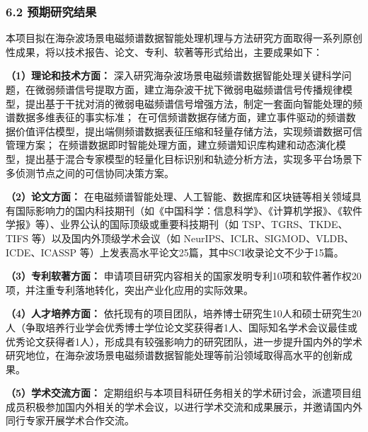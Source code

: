 \subsubsection{6.2 预期研究结果}

{\kaishu
	本项目拟在海杂波场景电磁频谱数据智能处理机理与方法研究方面取得一系列原创性成果，将以技术报告、论文、专利、软著等形式给出，主要成果如下：
	
	\textbf{（1）理论和技术方面：}
	深入研究海杂波场景电磁频谱数据智能处理关键科学问题，在微弱频谱信号提取方面，建立海杂波干扰下微弱电磁频谱信号传播规律模型，提出基于干扰对消的微弱电磁频谱信号增强方法，制定一套面向智能处理的频谱数据多维表征的事实标准；
	在可信频谱数据存储方面，建立事件驱动的频谱数据价值评估模型，提出端侧频谱数据表征压缩和轻量存储方法，实现频谱数据可信管理方案；
	在频谱数据即时智能处理方面，建立频谱知识库构建和动态演化模型，提出基于混合专家模型的轻量化目标识别和轨迹分析方法，实现多平台场景下多侦测节点之间的可信协同决策方案。
	
	\textbf{（2）论文方面：}
	在电磁频谱智能处理、人工智能、数据库和区块链等相关领域具有国际影响力的国内科技期刊（如《中国科学：信息科学》、《计算机学报》、《软件学报》等）、业界公认的国际顶级或重要科技期刊（如 TSP、TGRS、TKDE、TIFS 等）以及国内外顶级学术会议（如 NeurIPS、ICLR、SIGMOD、VLDB、ICDE、ICASSP 等）上发表高水平论文25篇，其中SCI收录论文不少于15篇。
	
	
	\textbf{（3）专利软著方面：}
	申请项目研究内容相关的国家发明专利10项和软件著作权20项，并注重专利落地转化，突出产业化应用的实际效果。
	
	\textbf{（4）人才培养方面：}
	依托现有的项目团队，培养博士研究生10人和硕士研究生20人（争取培养行业学会优秀博士学位论文奖获得者1人、国际知名学术会议最佳或优秀论文获得者1人），形成具有较强影响力的研究团队，进一步提升国内外的学术研究地位，在海杂波场景电磁频谱数据智能处理等前沿领域取得高水平的创新成果。
	
	\textbf{（5）学术交流方面：}
	定期组织与本项目科研任务相关的学术研讨会，派遣项目组成员积极参加国内外相关的学术会议，以进行学术交流和成果展示，并邀请国内外同行专家开展学术合作交流。
}
